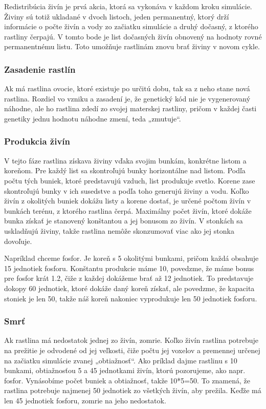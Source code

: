 \documentclass[12pt]{article}
\begin{document}
Redistribúcia živín je prvá akcia, ktorá sa vykonáva v každom kroku simulácie. Živiny sú totiž
ukladané v dvoch listoch, jeden permanentný, ktorý drží informácie o počte
živín a vody zo začiatku simulácie a druhý dočasný, z ktorého rastliny čerpajú.
V tomto bode je list dočasných živín obnovený na hodnoty rovné permanentnému listu.
Toto umožňuje rastlinám znovu brať živiny v novom cykle.

\subsubsection{Zasadenie rastlín}

Ak má rastlina ovocie, ktoré existuje po určitú dobu, tak sa z neho stane nová
rastlina. Rozdiel vo vzniku a zasadení je, že genetický kód nie je
vygenerovaný náhodne, ale ho rastlina zdedí zo svojej materskej rastliny,
pričom v každej časti genetiky jednu hodnotu náhodne zmení, teda „zmutuje“.

\subsubsection{Produkcia živín}

V tejto fáze rastlina získava živiny vďaka svojim bunkám, konkrétne listom
a koreňom. Pre každý list sa skontroľujú bunky horizontálne nad listom.
Podľa počtu tých buniek, ktoré predstavujú vzduch, list produkuje svetlo.
Korene zase skontroľujú bunky v ich susedstve a podľa toho generujú živiny a vodu.
Koľko živín z okolitých buniek dokážu listy
a korene dostať, je určené počtom živín v bunkách terénu, z ktorého
rastlina čerpá. Maximálny počet živín, ktoré dokáže bunka získať je stanovený
konštantou a jej bonusom zo živín. V stonkách sa uskladňujú živiny, takže
rastlina nemôže skonzumovať viac ako jej stonka dovoľuje. 

Napríklad chceme fosfor. Je koreň s 5 okolitými bunkami,
pričom každá obsahuje 15 jednotiek fosforu. Konštantu produkcie máme 10,
povedzme, že máme bonus pre fosfor krát 1.2, čiže z každej dokážeme brať až 12
jednotiek. To predstavuje dokopy 60 jednotiek, ktoré dokáže daný koreň získať,
ale povedzme, že kapacita stoniek je len 50, takže náš koreň nakoniec
vyprodukuje len 50 jednotiek fosforu.

\subsubsection{Smrť}

Ak rastlina má nedostatok jednej zo živín, zomrie. Koľko živín rastlina
potrebuje na prežitie je odvodené od jej veľkosti, čiže počtu jej voxelov
a premennej určenej na začiatku simulácie zvanej „obtiažnosť“. Ako príklad
dajme rastlinu s 10 bunkami, obtiažnosťou 5 a 45 jednotkami živín, ktorú
pozorujeme, ako napr. fosfor. Vynásobíme počet buniek a obtiažnosť, takže
10*5=50. To znamená, že rastlina potrebuje najmenej 50 jednotiek zo všetkých
živín, aby prežila. Keďže má len 45 jednotiek fosforu, zomrie na jeho
nedostatok.
\end{document}
